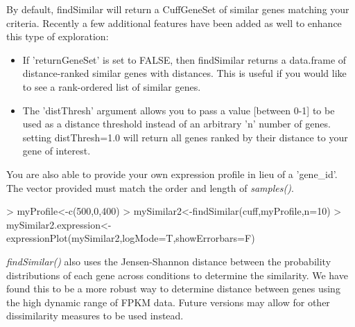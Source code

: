 \documentclass[10pt]{article}
\newcommand{\Rmethod}[1]{{\textit{#1}}}
\begin{document}
By default, findSimilar will return a CuffGeneSet of similar genes matching your criteria. 
Recently a few additional features have been added as well to enhance this type of exploration:

\begin{itemize}
	\item If 'returnGeneSet' is set to FALSE, then findSimilar returns a data.frame of distance-ranked similar genes with distances. This is useful if you would
	like to see a rank-ordered list of similar genes.
	\item The 'distThresh' argument allows you to pass a value [between 0-1] to be used as a distance threshold instead of an arbitrary 'n' number of genes. setting distThresh=1.0 will return all genes ranked by their distance to your gene of interest.
\end{itemize}

You are also able to provide your own expression profile in lieu of a 'gene\_id'.  The vector provided must match the order and length of \Rmethod{samples()}.

\begin{Schunk}
\begin{Sinput}
> myProfile<-c(500,0,400)
> mySimilar2<-findSimilar(cuff,myProfile,n=10)
> mySimilar2.expression<-expressionPlot(mySimilar2,logMode=T,showErrorbars=F)
\end{Sinput}
\end{Schunk}

\begin{figure}[htp]
	\begin{center}
	
	\end{center}
\end{figure}


\Rmethod{findSimilar()} also uses the Jensen-Shannon distance between the probability distributions of each gene across conditions to determine the similarity.  
We have found this to be a more robust way to determine distance between genes using the high dynamic range of FPKM data. Future versions may allow for other dissimilarity measures to be used instead.

\clearpage
\end{document}
